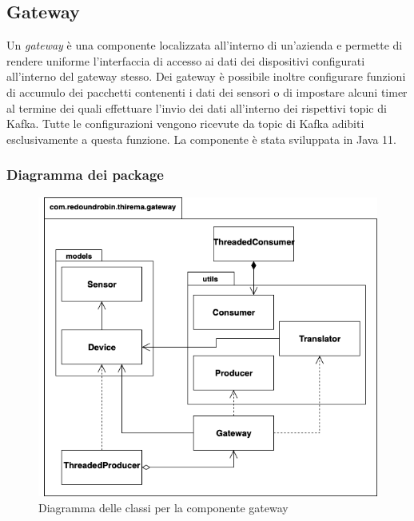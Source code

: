 \subsection{Gateway}
	Un \textit{gateway} è una componente localizzata all'interno di un'azienda e permette di rendere uniforme l'interfaccia di accesso ai dati dei dispositivi configurati all'interno del gateway stesso.
	Dei gateway è possibile inoltre configurare funzioni di accumulo dei pacchetti contenenti i dati dei sensori o di impostare alcuni timer al termine dei quali effettuare l'invio dei dati all'interno dei rispettivi topic di Kafka.
	Tutte le configurazioni vengono ricevute da topic di Kafka adibiti esclusivamente a questa funzione.
	La componente è stata sviluppata in Java 11.
	
	\subsubsection{Diagramma dei package}%
	  	\begin{figure}[H]
			\centering
			\includegraphics[scale=0.550]{res/images/GATEWAY/GatewayPackage.png}
			\caption{Diagramma delle classi per la componente gateway}
		\end{figure}		

